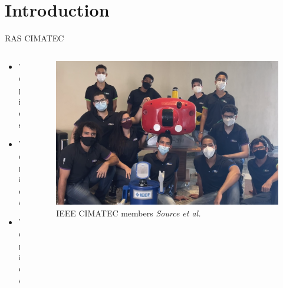 \section{Introduction}

\begin{frame}{RAS CIMATEC}
    \begin{columns}
        \begin{column}{0.4\textwidth}
            \begin{itemize}
                \item Topics
                \item Topics
                \item Topics
            \end{itemize}
        \end{column}

        \begin{column}{0.6\textwidth}
            \begin{figure}
                \centering
                \includegraphics[height = 0.6\textheight]{img/team2.png}
                \caption{IEEE CIMATEC members \textit{Source et al.}}
            \end{figure}
        \end{column}

    \end{columns}
\end{frame}

